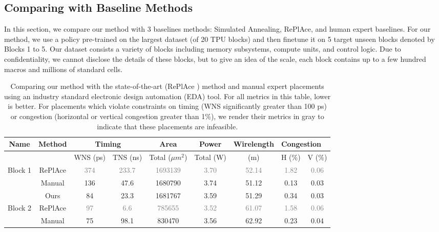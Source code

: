 \documentclass{article}
\begin{document}
\subsection{Comparing with Baseline Methods}
 In this section, we compare our method with 3 baselines methods: Simulated Annealing, RePlAce, and human expert baselines. For our method, we use a policy pre-trained on the largest dataset (of 20 TPU blocks) and then finetune it on 5 target unseen blocks denoted by Blocks 1 to 5. Our dataset consists a variety of blocks including memory subsystems, compute units, and control logic. Due to confidentiality, we cannot disclose the details of these blocks, but to give an idea of the scale, each block contains up to a few hundred macros and millions of standard cells.


\begin{table}[t]
\centering
\caption{Comparing our method with the state-of-the-art (RePlAce \cite{RePlAce19}) method and manual expert placements using an industry standard electronic design automation (EDA) tool. For all metrics in this table, lower is better. For placements which violate constraints on timing (WNS significantly greater than 100 ps) or congestion (horizontal or vertical congestion greater than 1\%), we render their metrics in gray to indicate that these placements are infeasible.}
\label{table:replace-comparison}
\begin{tabular}{|c|c|c|c|c|c|c|c|c|}
\hline
Name & Method & \multicolumn{2}{c|}{Timing} & Area & Power & Wirelength & \multicolumn{2}{l|}{Congestion}\\ \hline
  & & WNS (ps) & TNS (ns) & Total ($\mu m^2$) & Total (W) & (m) & H (\%) & V (\%) \\ \Xhline{4\arrayrulewidth}
Block 1 & RePlAce &  \textcolor{gray}{374} & \textcolor{gray}{233.7} & \textcolor{gray}{1693139} & \textcolor{gray}{3.70} & \textcolor{gray}{52.14} & \textcolor{gray}{1.82} & \textcolor{gray}{0.06} \\ \hline
& Manual &	136 &	47.6 & {1680790} & 3.74 & {51.12} &	{0.13} & 0.03  \\ \hline
& Ours & {84} &	{23.3} & {1681767} & {3.59} & {51.29} & 0.34 & {0.03}
\\ \Xhline{4\arrayrulewidth}
Block 2 & RePlAce  & \textcolor{gray}{97} & \textcolor{gray}{6.6} & \textcolor{gray}{785655} & \textcolor{gray}{3.52} &
\textcolor{gray}{61.07} & \textcolor{gray}{1.58} & \textcolor{gray}{0.06}\\ \hline
&Manual  &	75 & 98.1 & 830470 & 3.56 & 62.92 &	{0.23} & 0.04\\ \hline

\end{tabular}
\end{table}
\end{document}

